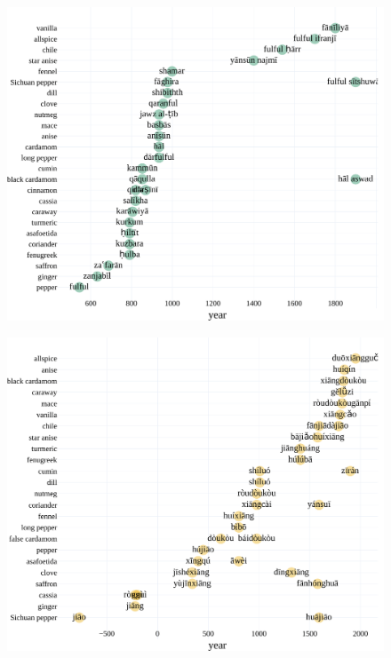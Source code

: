 \begin{figure}[!ht]
  \centering
  \includegraphics[width=\linewidth]{imgs/plots/attestation_ar.pdf}
  \caption{}
  \label{fig:set_ar}
\end{figure}

\begin{figure}[!ht]
  \centering
  \includegraphics[width=\linewidth]{imgs/plots/attestation_zh.pdf}
  \caption{}
  \label{fig:set_zh}
\end{figure}


